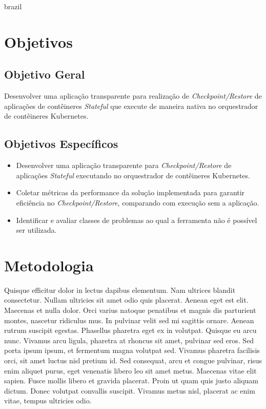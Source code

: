 \begin{otherlanguage*}{brazil}
        \section*{Objetivos}
        
        \subsection{Objetivo Geral}
        
        Desenvolver uma aplicação transparente para realização de
        \textit{Checkpoint/Restore} de aplicações de contêineres \textit{Stateful}
        que execute de maneira nativa no orquestrador de contêineres Kubernetes.
        
        \subsection{Objetivos Específicos}

		\begin{itemize}
	    		\item Desenvolver uma aplicação transparente para
	    		\textit{Checkpoint/Restore} de aplicações \textit{Stateful} executando
	    		no orquestrador de contêineres Kubernetes.
    			\item Coletar métricas da performance da solução implementada para garantir
    			eficiência no \textit{Checkpoint/Restore}, comparando com execução sem
    			a aplicação.
		    \item Identificar e avaliar classes de problemas ao qual a ferramenta não é
		    possível ser utilizada.
		\end{itemize}

        \section*{Metodologia}
        Quisque efficitur dolor in lectus dapibus elementum. Nam ultrices blandit consectetur.
        Nullam ultricies sit amet odio quis placerat. Aenean eget est elit. Maecenas et nulla dolor.
        Orci varius natoque penatibus et magnis dis parturient montes, nascetur ridiculus mus. In
        pulvinar velit sed mi sagittis ornare. Aenean rutrum suscipit egestas. Phasellus pharetra
        eget ex in volutpat. Quisque eu arcu nunc. Vivamus arcu ligula, pharetra at rhoncus sit
        amet, pulvinar sed eros. Sed porta ipsum ipsum, et fermentum magna volutpat sed. Vivamus
        pharetra facilisis orci, sit amet luctus nisl pretium id. Sed consequat, arcu et congue
        pulvinar, risus enim aliquet purus, eget venenatis libero leo sit amet metus. Maecenas vitae
        elit sapien. Fusce mollis libero et gravida placerat. Proin ut quam quis justo aliquam
        dictum. Donec volutpat convallis suscipit. Vivamus metus nisl, placerat ac enim vitae,
        tempus ultricies odio.


\end{otherlanguage*}

